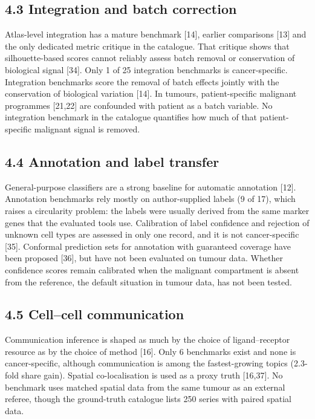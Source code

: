 \documentclass[11pt]{article}
\begin{document}
\subsection{4.3 Integration and batch correction}\label{integration-and-batch-correction}

Atlas-level integration has a mature benchmark {[}14{]}, earlier
comparisons {[}13{]} and the only dedicated metric critique in the
catalogue. That critique shows that silhouette-based scores cannot
reliably assess batch removal or conservation of biological signal
{[}34{]}. Only 1 of 25 integration benchmarks is cancer-specific.
Integration benchmarks score the removal of batch effects jointly with
the conservation of biological variation {[}14{]}. In tumours,
patient-specific malignant programmes {[}21,22{]} are confounded with
patient as a batch variable. No integration benchmark in the catalogue
quantifies how much of that patient-specific malignant signal is
removed.

\subsection{4.4 Annotation and label transfer}\label{annotation-and-label-transfer}

General-purpose classifiers are a strong baseline for automatic
annotation {[}12{]}. Annotation benchmarks rely mostly on
author-supplied labels (9 of 17), which raises a circularity problem:
the labels were usually derived from the same marker genes that the
evaluated tools use. Calibration of label confidence and rejection of
unknown cell types are assessed in only one record, and it is not
cancer-specific {[}35{]}. Conformal prediction sets for annotation with
guaranteed coverage have been proposed {[}36{]}, but have not been
evaluated on tumour data. Whether confidence scores remain calibrated
when the malignant compartment is absent from the reference, the default
situation in tumour data, has not been tested.

\subsection{4.5 Cell--cell communication}\label{cellcell-communication}

Communication inference is shaped as much by the choice of
ligand--receptor resource as by the choice of method {[}16{]}. Only 6
benchmarks exist and none is cancer-specific, although communication is
among the fastest-growing topics (2.3-fold share gain). Spatial
co-localisation is used as a proxy truth {[}16,37{]}. No benchmark uses
matched spatial data from the same tumour as an external referee, though
the ground-truth catalogue lists 250 series with paired spatial data.
\end{document}
